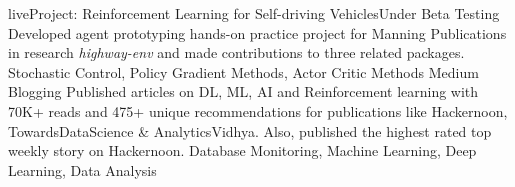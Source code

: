 
\begin{projects}
    \project
	{liveProject: Reinforcement Learning for Self-driving Vehicles}{Under Beta Testing}
	{}
	{Developed agent prototyping hands-on practice project for Manning Publications in research \textit{highway-env} and made contributions to three related packages.}
	{Stochastic Control, Policy Gradient Methods, Actor Critic Methods}
	\project
	{Medium Blogging}{}
	{
	}
	{Published articles on DL, ML, AI and Reinforcement learning with 70K+ reads and 475+ unique recommendations for publications like Hackernoon, TowardsDataScience \& AnalyticsVidhya. Also, published the highest rated top weekly story on Hackernoon.}
	{Database Monitoring, Machine Learning, Deep Learning, Data Analysis}
	
	\iffalse
    \project
    {ML Hackathons}{}
	{}
	{In Top 5\% solutions for ZS Data Science 2019 Challenge. In Top 15\% solutions in Imarticus Car price prediction Challenge. \& Top 11\% Analytic Vidhya’s India 2019 Hackathon.}
	{Data transformations, Model Prototyping, Feature Engineering, Ensemble models}
    \project
    {Competitive Coding}{}
	{}
	{Global Rank: 210 in Div 2, October Mega Cook-Off 2018 on Codechef for username rana\_160796.}
	{Graphs, Dynamic Programming, Trees, Arrays, Strings}
    \fi
    
\end{projects}